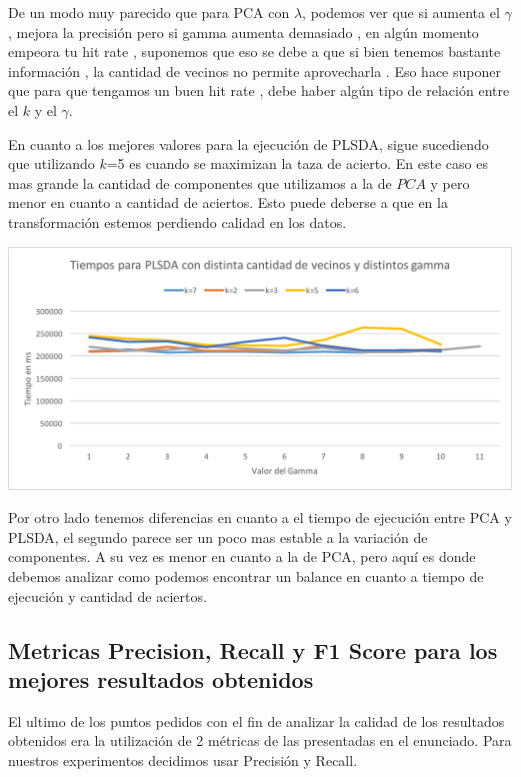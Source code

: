 De un modo muy parecido que para PCA con $\lambda$, podemos ver que si aumenta el $\gamma$, mejora la precisión pero si gamma aumenta demasiado , en algún momento empeora tu hit rate , suponemos que eso se debe a que si bien tenemos bastante información , la cantidad de vecinos no permite aprovecharla . Eso hace suponer que para que tengamos un buen hit rate , debe haber algún tipo de relación entre el $k$ y el $\gamma$.

En cuanto a los mejores valores para la ejecución de PLSDA, sigue sucediendo que utilizando $k$=5 es cuando se maximizan la taza de acierto. En este caso es mas grande la cantidad de componentes que utilizamos a la de $PCA$ y pero menor en cuanto a cantidad de aciertos. Esto puede deberse a que en la transformación estemos perdiendo calidad en los datos.

\begin{center}
\includegraphics[scale=0.8]{imagenes/TiemposPLSDA.png}
\end{center}

Por otro lado tenemos diferencias en cuanto a el tiempo de ejecución entre PCA y PLSDA, el segundo parece ser un poco mas estable a la variación de componentes. A su vez es menor en cuanto a la de PCA, pero aquí es donde debemos analizar como podemos encontrar un balance en cuanto a tiempo de ejecución y cantidad de aciertos.

\subsection {Metricas Precision, Recall y F1 Score para los mejores resultados obtenidos}

El ultimo de los puntos pedidos con el fin de analizar la calidad de los resultados obtenidos era la utilización de 2 métricas de las presentadas en el enunciado. Para nuestros experimentos decidimos usar Precisión y Recall.

